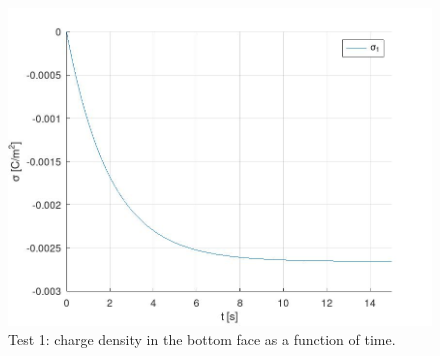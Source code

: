 \documentclass{Configuration_Files/PoliMi3i_thesis}
\begin{document}
\begin{figure}[h!]
    \centering
   \includegraphics[scale=0.2]{Images/1.rho_time.jpeg}
    \caption {Test 1: charge density in the bottom face as a function of time.}
    \label{fig: 1.4}
\end{figure}
\end{document}

